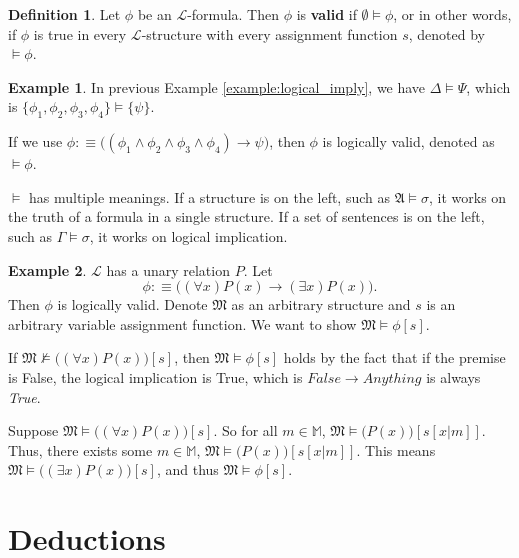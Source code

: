 \documentclass[11pt,letterpaper]{book}
\theoremstyle{definition}
\newtheorem{definition}{Definition}[section]
\newtheorem{example}{Example}[section]
\begin{document}
\begin{definition}\label{def:valid}
Let $\phi$ be an $\mathcal{L}$-formula. Then $\phi$ is \textbf{valid} if
$\emptyset \models \phi$, or in other words, if $\phi$ is true in every
$\mathcal{L}$-structure with every assignment function $s$, denoted by
$\models \phi$.
\end{definition}

\begin{example}
In previous Example \ref{example:logical_imply}, we have $\Delta \models
\Psi$, which is $\{ \phi_1, \phi_2, \phi_3, \phi_4 \} \models \{ \psi \} $.

If we use $\phi: \equiv \Big( ( \phi_1 \land \phi_2 \land \phi_3 \land
\phi_4 ) \rightarrow \psi \Big) $, then $\phi$ is logically valid,
denoted as $\models \phi$.
\end{example}


$\models$ has multiple meanings. If a structure is on the left, such as
$\mathfrak{A}\models \sigma$, it works on the truth of a formula in a
single structure. If a set of sentences is on the left, such as $\Gamma
\models \sigma$, it works on logical implication.

\begin{example}
$\mathcal{L}$ has a unary relation $P$. Let
$$\phi :\equiv \Big( (\forall
x) P(x) \rightarrow (\exists x ) P(x) \Big).$$
Then $\phi$ is logically valid. Denote $\mathfrak{M}$ as an arbitrary 
structure and $s$ is an arbitrary variable assignment function. We want 
to show $\mathfrak{M} \models \phi[s]$.

If $\mathfrak{M} \not \models \Big( (\forall x) P(x) \Big)[s]$, then
$\mathfrak{M} \models \phi[s]$ holds by the fact that if the premise is
False, the logical implication is True, which is $False \rightarrow
Anything$ is always \emph{True}.

Suppose $\mathfrak{M} \models \Big( (\forall x) P(x) \Big)[s]$. So for
all $m \in \mathbb{M}$, $\mathfrak{M} \models \Big( P(x) \Big)
[s[x|m]]  $. Thus, there exists some $m \in \mathbb{M}$, $\mathfrak{M}
\models
\Big( P(x) \Big) [s[x|m]]  $. This means $\mathfrak{M} \models \Big(
(\exists x) P(x) \Big) [s]$, and thus $\mathfrak{M} \models \phi[s] $.

\end{example}


\chapter{Deductions}
\end{document}
